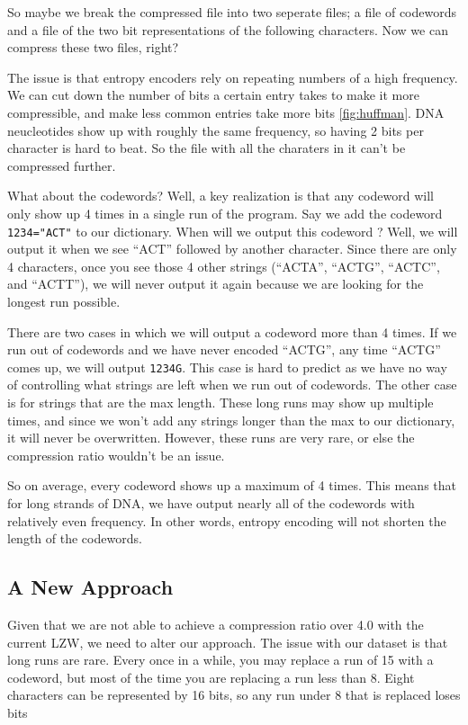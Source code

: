 \documentclass[12pt,twoside]{reedthesis}
\begin{document}
So maybe we break the compressed file into two seperate files; a file of codewords and a file of the two bit representations of the following characters. Now we can compress these two files, right?

The issue is that entropy encoders rely on repeating numbers of a high frequency. We can cut down the number of bits a certain entry takes to make it more compressible, and make less common entries take more bits \ref{fig:huffman}. DNA neucleotides show up with roughly the same frequency, so having 2 bits per character is hard to beat. So the file with all the charaters in it can't be compressed further.

What about the codewords? Well, a key realization is that any codeword will only show up 4 times in a single run of the program. Say we add the codeword \texttt{1234="ACT"} to our dictionary. When will we output this codeword ? Well, we will output it when we see ``ACT'' followed by another character. Since there are only 4 characters, once you see those 4 other strings (``ACTA'', ``ACTG'', ``ACTC'', and ``ACTT''), we will never output it again because we are looking for the longest run possible.

There are two cases in which we will output a codeword more than 4 times. If we run out of codewords and we have never encoded ``ACTG'', any time ``ACTG'' comes up, we will output \texttt{1234G}. This case is hard to predict as we have no way of controlling what strings are left when we run out of codewords. The other case is for strings that are the max length. These long runs may show up multiple times, and since we won't add any strings longer than the max to our dictionary, it will never be overwritten. However, these runs are very rare, or else the compression ratio wouldn't be an issue.

So on average, every codeword shows up a maximum of 4 times. This means that for long strands of DNA, we have output nearly all of the codewords with relatively even frequency. In other words, entropy encoding will not shorten the length of the codewords.

\hypertarget{a-new-approach}{%
\subsection{A New Approach}\label{a-new-approach}}

Given that we are not able to achieve a compression ratio over 4.0 with the current LZW, we need to alter our approach. The issue with our dataset is that long runs are rare. Every once in a while, you may replace a run of 15 with a codeword, but most of the time you are replacing a run less than 8. Eight characters can be represented by 16 bits, so any run under 8 that is replaced loses bits
\end{document}
